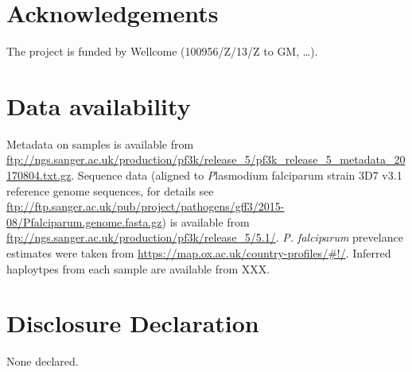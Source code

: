 \documentclass[9pt,lineno]{elife}
\begin{document}
\section{Acknowledgements}
The project is funded by  Wellcome (100956/Z/13/Z to GM, \ldots).


\section{Data availability}
Metadata on samples is available from \url{ftp://ngs.sanger.ac.uk/production/pf3k/release_5/pf3k_release_5_metadata_20170804.txt.gz}.  Sequence data (aligned to {\emph Plasmodium falciparum} strain 3D7 v3.1 reference genome sequences, for details see \url{      ftp://ftp.sanger.ac.uk/pub/project/pathogens/gff3/2015-08/Pfalciparum.genome.fasta.gz}) is available from  \url{ftp://ngs.sanger.ac.uk/production/pf3k/release_5/5.1/}.  {\it P. falciparum} prevelance estimates were taken from \url{https://map.ox.ac.uk/country-profiles/#!/}.  Inferred haploytpes from each sample are available from XXX.


\section{Disclosure Declaration}
None declared.



\end{document}
